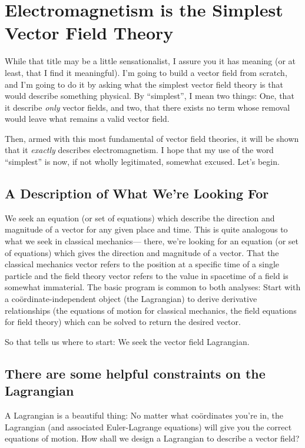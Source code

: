 \documentclass[11pt]{article}
\begin{document}
\section{Electromagnetism is the Simplest Vector Field Theory}
While that title may be a little sensationalist, I assure you it has meaning (or at least, that I find it meaningful).  I'm going to build a vector field from scratch, and I'm going to do it by asking what the simplest vector field theory is that would describe something physical.  By ``simplest'', I mean two things:  One, that it describe \emph{only} vector fields, and two, that there exists no term whose removal would leave what remains a valid vector field.

Then, armed with this most fundamental of vector field theories, it will be shown that it \emph{exactly} describes electromagnetism.  I hope that my use of the word ``simplest'' is now, if not wholly legitimated, somewhat excused.  Let's begin.
\subsection{A Description of What We're Looking For}
We seek an equation (or set of equations) which describe the direction and magnitude of a vector for any given place and time.  This is quite analogous to what we seek in classical mechanics--- there, we're looking for an equation (or set of equations) which gives the direction and magnitude of a vector.  That the classical mechanics vector refers to the position at a specific time of a single particle and the field theory vector refers to the value in spacetime of a field is somewhat immaterial.  The basic program is common to both analyses: Start with a co\"{o}rdinate-independent object (the Lagrangian) to derive derivative relationships (the equations of motion for classical mechanics, the field equations for field theory) which can be solved to return the desired vector.

So that tells us where to start:  We seek the vector field Lagrangian.


\subsection{There are some helpful constraints on the Lagrangian}
A Lagrangian is a beautiful thing:  No matter what co\"{o}rdinates you're in, the Lagrangian (and associated Euler-Lagrange equations) will give you the correct equations of motion.  How shall we design a Lagrangian to describe a vector field?
\end{document}
